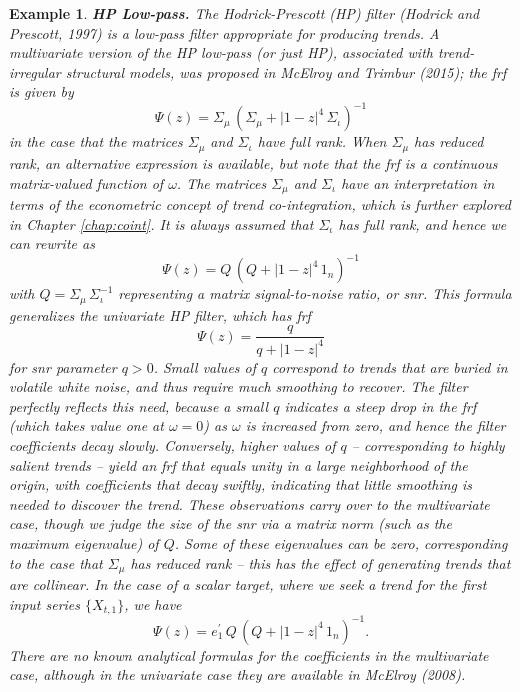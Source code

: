 \documentclass[a4paper]{book}
\newtheorem{Example}{Example}
\begin{document}
\begin{Example} {\bf HP Low-pass.} \rm
\label{exam:hp-low}
 The Hodrick-Prescott (HP) filter (Hodrick
and Prescott, 1997) is a low-pass filter appropriate for producing trends.
 A multivariate version of the HP low-pass (or just HP), 
 associated with trend-irregular structural models,
 was proposed in McElroy and Trimbur (2015); the frf is given by
\[
   \Psi (z) = \Sigma_{\mu} \, { \left( \Sigma_{\mu} + {|1 - z|}^4 \, \Sigma_{\iota} 
	\right) }^{-1}
\]
 in the case that the matrices $\Sigma_{\mu}$ and $\Sigma_{\iota}$ have full rank.  
  When $\Sigma_{\mu}$ has reduced rank, an alternative expression is available,
 but note that the frf is a continuous matrix-valued function of $\omega$.
The matrices $\Sigma_{\mu}$ and $\Sigma_{\iota}$ have an interpretation in terms
 of the econometric concept of trend co-integration, which is further explored
 in Chapter \ref{chap:coint}.  It is always assumed that $\Sigma_{\iota}$ has full rank, 
 and hence  we can rewrite as
\[
  \Psi (z) = Q \, { \left( Q + {| 1 - z|}^4 \, 1_n \right) }^{-1}
\]
 with $Q = \Sigma_{\mu} \, \Sigma_{\iota}^{-1}$ representing a matrix
 {\em signal-to-noise ratio}, or snr.  This formula 
  generalizes the univariate HP filter, which has frf
\[
 \Psi (z) = \frac{ q}{ q + {| 1 - z|}^4 }
\]
 for snr parameter $q > 0$.  Small values of $q$ correspond to trends that are
 buried in volatile white noise, and thus require much smoothing to recover.
 The filter perfectly reflects this need, because a small $q$ indicates a steep
 drop in the frf (which takes value one at $\omega = 0$) as $\omega$ is increased
 from zero, and hence the filter coefficients decay slowly.  Conversely, higher values
 of $q$ -- corresponding to highly salient trends -- yield an frf that equals unity
 in a large neighborhood of the origin, with coefficients that decay swiftly,
 indicating that little smoothing is needed to discover the trend.  These observations
 carry over to the multivariate case, though we judge the size of the snr via a
 matrix norm (such as the maximum eigenvalue) of $Q$.  Some of these eigenvalues can be
 zero, corresponding to the case that $\Sigma_{\mu}$ has reduced rank -- this has the
 effect of generating trends that are collinear.  In the case of a scalar target,
 where we seek a trend for the first input series $\{ X_{t,1} \}$,  we have 
\[
  \Psi (z) = e_1^{\prime} \, Q \, { \left( Q + {| 1 - z|}^4 \, 1_n \right) }^{-1}.
\]
 There are no known analytical formulas for the coefficients in the multivariate case,
 although in the univariate case they are available in McElroy (2008).
\end{Example}
\end{document}
